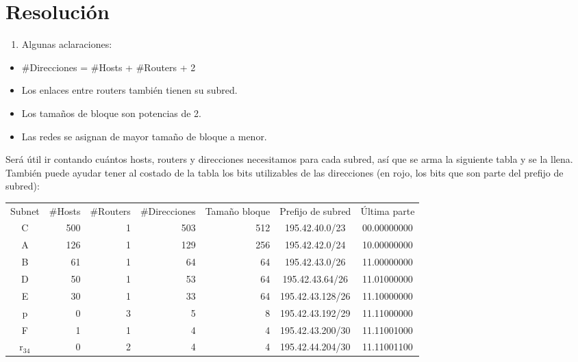 \section*{Resolución}

\noindent
\begin{enumerate}[left=0cm]
\item Algunas aclaraciones:
\end{enumerate}

\begin{itemize}
\item \#Direcciones = \#Hosts + \#Routers + 2
\item Los enlaces entre routers también tienen su subred.
\item Los tamaños de bloque son potencias de 2.
\item Las redes se asignan de mayor tamaño de bloque a menor.
\end{itemize}

Será útil ir contando cuántos hosts, routers y direcciones necesitamos para cada subred, así que se arma la siguiente tabla y se la llena. También puede ayudar tener al costado de la tabla los bits utilizables de las direcciones (en rojo, los bits que son parte del prefijo de subred):

\begin{table}[H]
    \centering
    \begin{tabular}{|c|r|r|r|r|c|c}
    \cline{1-6}
    \multicolumn{1}{|c|}{Subnet} & \multicolumn{1}{c|}{\#Hosts} & \multicolumn{1}{c|}{\#Routers} & \multicolumn{1}{c|}{\#Direcciones} & \multicolumn{1}{c|}{Tamaño bloque} & \multicolumn{1}{c|}{Prefijo de subred} & Última parte\\ \cline{1-6}
    C & 500 & 1 & 503 & 512 & 195.42.40.0/23 & {\color{red}0}0.00000000\\ \cline{1-6}
    A & 126 & 1 & 129 & 256 & 195.42.42.0/24 & {\color{red}10}.00000000\\ \cline{1-6}
    B & 61 & 1 & 64 & 64 & 195.42.43.0/26 & {\color{red}11.00}000000\\ \cline{1-6}
    D & 50 & 1 & 53 & 64 & 195.42.43.64/26 & {\color{red}11.01}000000\\ \cline{1-6}
    E & 30 & 1 & 33 & 64 & 195.42.43.128/26 & {\color{red}11.10}000000\\ \cline{1-6}
    p & 0 & 3 & 5 & 8 & 195.42.43.192/29 & {\color{red}11.11000}000\\ \cline{1-6}
    F & 1 & 1 & 4 & 4 & 195.42.43.200/30 & {\color{red}11.110010}00\\ \cline{1-6}
    $\text{r}_{34}$ & 0 & 2 & 4 & 4 & 195.42.44.204/30 & {\color{red}11.110011}00\\\cline{1-6}
    \end{tabular}
\end{table}

